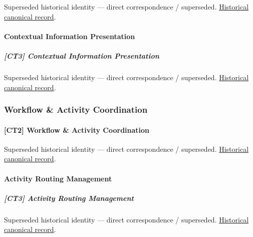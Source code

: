 \par\label{element:c89e7c8b277247d9965fdb534aad2d1f}
Superseded historical identity — direct correspondence / superseded. \href{../../../../continuum/strategy/capability/c89e7c8b277247d9965fdb534aad2d1f.md}{Historical canonical record}.\par

\paragraph{Contextual Information Presentation}

\subparagraph{[CT3] Contextual Information Presentation}

\par\label{element:e349d5f6a8774bbe8d150f9c51af770c}
Superseded historical identity — direct correspondence / superseded. \href{../../../../continuum/strategy/capability/e349d5f6a8774bbe8d150f9c51af770c.md}{Historical canonical record}.\par

\subsubsection{Workflow \& Activity Coordination}

\paragraph{[CT2] Workflow \& Activity Coordination}

\par\label{element:4422d865978c4353ad575759c6026d27}
Superseded historical identity — direct correspondence / superseded. \href{../../../../continuum/strategy/capability/4422d865978c4353ad575759c6026d27.md}{Historical canonical record}.\par

\paragraph{Activity Routing Management}

\subparagraph{[CT3] Activity Routing Management}

\par\label{element:243ea93e7b7448fe97dc74f90bfc8946}
Superseded historical identity — direct correspondence / superseded. \href{../../../../continuum/strategy/capability/243ea93e7b7448fe97dc74f90bfc8946.md}{Historical canonical record}.\par


